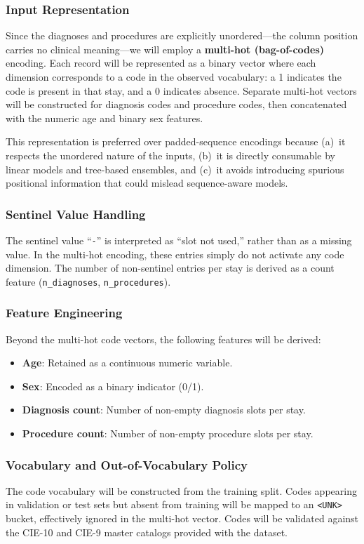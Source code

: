 \subsubsection{Input Representation}
Since the diagnoses and procedures are explicitly unordered---the column position carries no clinical meaning---we will employ a \textbf{multi-hot (bag-of-codes)} encoding. Each record will be represented as a binary vector where each dimension corresponds to a code in the observed vocabulary: a 1 indicates the code is present in that stay, and a 0 indicates absence. Separate multi-hot vectors will be constructed for diagnosis codes and procedure codes, then concatenated with the numeric age and binary sex features.

This representation is preferred over padded-sequence encodings because (a)~it respects the unordered nature of the inputs, (b)~it is directly consumable by linear models and tree-based ensembles, and (c)~it avoids introducing spurious positional information that could mislead sequence-aware models.

\subsubsection{Sentinel Value Handling}
The sentinel value ``\texttt{-}'' is interpreted as ``slot not used,'' rather than as a missing value. In the multi-hot encoding, these entries simply do not activate any code dimension. The number of non-sentinel entries per stay is derived as a count feature (\texttt{n\_diagnoses}, \texttt{n\_procedures}).

\subsubsection{Feature Engineering}
Beyond the multi-hot code vectors, the following features will be derived:
\begin{itemize}
    \item \textbf{Age}: Retained as a continuous numeric variable.
    \item \textbf{Sex}: Encoded as a binary indicator (0/1).
    \item \textbf{Diagnosis count}: Number of non-empty diagnosis slots per stay.
    \item \textbf{Procedure count}: Number of non-empty procedure slots per stay.
\end{itemize}

\subsubsection{Vocabulary and Out-of-Vocabulary Policy}
The code vocabulary will be constructed from the training split. Codes appearing in validation or test sets but absent from training will be mapped to an \texttt{<UNK>} bucket, effectively ignored in the multi-hot vector. Codes will be validated against the CIE-10 and CIE-9 master catalogs provided with the dataset.

